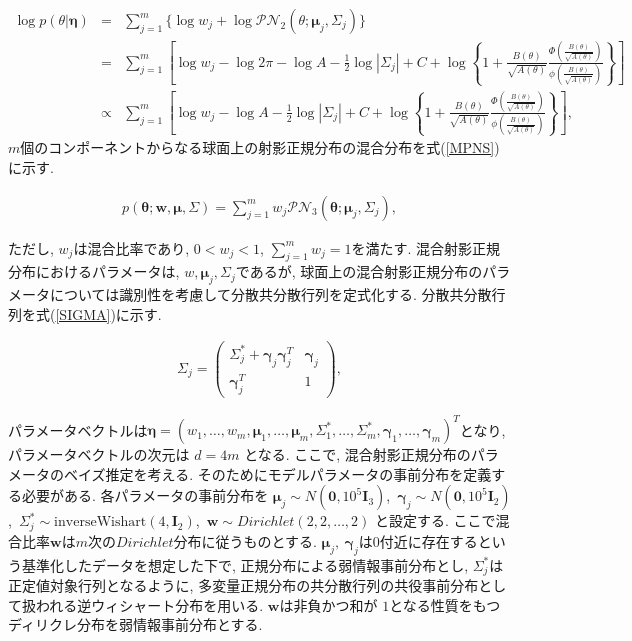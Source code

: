 \documentclass[a4j,12pt]{jarticle}
\begin{document}
\footnotesize
\begin{eqnarray}
\label{logPNC}
\log p(\theta | \bm \eta) &=& \sum^m_{j=1} \{\log w_j + \log \mathcal{PN}_2(\theta;\bm \mu_j, \Sigma_j)\} \nonumber \\ 
&=& \sum^m_{j=1} \left[ \log w_j - \log 2\pi - \log A - \frac{1}{2} \log |\Sigma_j| + C + \log \left\{1 + \frac{B(\theta)}{\sqrt{A(\theta)}} \frac{\Phi \left(\frac{B(\theta)}{\sqrt{A(\theta)}}\right)}{\phi \left(\frac{B(\theta)}{\sqrt{A(\theta)}}\right)}\right\} \right] \nonumber \\
&\propto& \sum^m_{j=1} \left[ \log w_j - \log A - \frac{1}{2} \log |\Sigma_j| + C + \log \left\{1 + \frac{B(\theta)}{\sqrt{A(\theta)}} \frac{\Phi \left(\frac{B(\theta)}{\sqrt{A(\theta)}}\right)}{\phi \left(\frac{B(\theta)}{\sqrt{A(\theta)}}\right)}\right\} \right], 
\end{eqnarray}
\normalsize
\fi
$m$個のコンポーネントからなる球面上の射影正規分布の混合分布を式(\ref{MPNS})に示す. 

\vspace{-2zh}
\begin{eqnarray}
\label{MPNS}
p(\bm \theta;\bm w,\bm \mu, \Sigma) = \sum^m_{j=1} w_j \mathcal{PN}_3(\bm \theta;\bm \mu_j, \Sigma_j),
\end{eqnarray}

\noindent
ただし, $w_j$は混合比率であり, $0 < w_j < 1$, $\sum^m_{j=1} w_j = 1$を満たす. 混合射影正規分布におけるパラメータは, $w, \bm \mu_j, \Sigma_j$であるが, 球面上の混合射影正規分布のパラメータについては識別性を考慮して分散共分散行列を定式化する. 分散共分散行列を式(\ref{SIGMA})に示す.

\begin{eqnarray}
\label{SIGMA}
 \Sigma_j = \left(
    \begin{array}{cc}
      \Sigma^*_j + \bm \gamma_j \bm \gamma_j^T & \bm \gamma_j \\
      \bm \gamma_j^T & 1
    \end{array}
  \right),
\end{eqnarray}

\noindent
パラメータベクトルは$\bm \eta = (w_1, \dots, w_m, \bm \mu_1, \dots, \bm \mu_m, \Sigma^*_1, \dots, \Sigma^*_m, \bm \gamma_1, \dots, \bm \gamma_m)^T$となり, パラメータベクトルの次元は $d = 4m$ となる. ここで, 混合射影正規分布のパラメータのベイズ推定を考える. そのためにモデルパラメータの事前分布を定義する必要がある. 各パラメータの事前分布を $\bm \mu_j \sim N(\bm 0, 10^5 \bm I_3)$,\ $\bm \gamma_j \sim  N(\bm 0, 10^5 \bm I_2)$,\ $\Sigma^*_j \sim \mathrm{inverse Wishart}(4,\bm I_2)$,\ $\bm w \sim Dirichlet(2,2, \dots, 2)$ と設定する. ここで混合比率$\bm w$は$m$次の$Dirichlet$分布に従うものとする. $\bm \mu_j,\ \bm \gamma_j$は$0$付近に存在するという基準化したデータを想定した下で, 正規分布による弱情報事前分布とし, $\Sigma^*_j$は正定値対象行列となるように, 多変量正規分布の共分散行列の共役事前分布として扱われる逆ウィシャート分布を用いる. $\bm w$は非負かつ和が $1$となる性質をもつディリクレ分布を弱情報事前分布とする.
\end{document}
